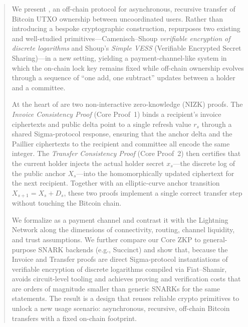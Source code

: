\begin{abstract}
We present \thunderbolt, an off-chain protocol for asynchronous, recursive transfer of Bitcoin UTXO ownership between uncoordinated users. Rather than introducing a bespoke cryptographic construction, \thunderbolt repurposes two existing and well-studied primitives—Camenisch--Shoup \emph{verifiable encryption of discrete logarithms} and Shoup's \emph{Simple VESS} (Verifiable Encrypted Secret Sharing)—in a new setting, yielding a payment-channel-like system in which the on-chain lock key remains fixed while off-chain ownership evolves through a sequence of ``one add, one subtract'' updates between a holder and a committee.

At the heart of \thunderbolt are two non-interactive zero-knowledge (NIZK) proofs. The \emph{Invoice Consistency Proof} (Core Proof~1) binds a recipient's invoice ciphertexts and public delta point to a single refresh value $r_s$ through a shared Sigma-protocol response, ensuring that the anchor delta and the Paillier ciphertexts to the recipient and committee all encode the same integer. The \emph{Transfer Consistency Proof} (Core Proof~2) then certifies that the current holder injects the actual holder secret $x_s$—the discrete log of the public anchor $X_s$—into the homomorphically updated ciphertext for the next recipient. Together with an elliptic-curve anchor transition $X_{s+1} = X_s + D_s$, these two proofs implement a single correct transfer step without touching the Bitcoin chain.

We formalize \thunderbolt as a payment channel and contrast it with the Lightning Network along the dimensions of connectivity, routing, channel liquidity, and trust assumptions. We further compare our Core ZKP to general-purpose SNARK backends (e.g., Succinct) and show that, because the Invoice and Transfer proofs are direct Sigma-protocol instantiations of verifiable encryption of discrete logarithms compiled via Fiat--Shamir, \thunderbolt avoids circuit-level tooling and achieves proving and verification costs that are orders of magnitude smaller than generic SNARKs for the same statements. The result is a design that reuses reliable crypto primitives to unlock a new usage scenario: asynchronous, recursive, off-chain Bitcoin transfers with a fixed on-chain footprint.
\end{abstract}
